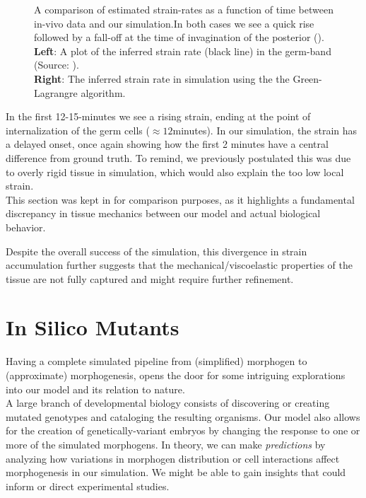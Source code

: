 \begin{figure}[H]
\begin{subfigure}{0.45\linewidth}
    \end{subfigure}
    \caption{A comparison of estimated strain-rates as a function of time between in-vivo data and our simulation.In both cases we see a quick rise followed by a fall-off at the time of invagination of the posterior (). \\\textbf{Left}: A plot of the inferred strain rate (black line) in the germ-band (Source: ). \\\textbf{Right}: The inferred strain rate in simulation using the the Green-Lagrangre algorithm.\\
   }
    \label{fig:strain}
\end{figure}

In the first 12-15-minutes we see a rising strain, ending at the point of internalization of the germ cells ($\approx12$minutes). In our simulation, the strain has a delayed onset, once again showing how the first 2 minutes have a central difference from ground truth. To remind, we previously postulated this was due to overly rigid tissue in simulation, which would also explain the too low local strain. \\

This section was kept in for comparison purposes, as it highlights a fundamental discrepancy in tissue mechanics between our model and actual biological behavior.  

Despite the overall success of the simulation, this divergence in strain accumulation further suggests that the mechanical/viscoelastic properties of the tissue are not fully captured and might require further refinement. 



\newpage
\section{In Silico Mutants}
Having a complete simulated pipeline from (simplified) morphogen to (approximate) morphogenesis, opens the door for some intriguing explorations into our model and its relation to nature. \\


A large branch of developmental biology consists of discovering or creating mutated genotypes and cataloging the resulting organisms. 
Our model also allows for the creation of genetically-variant embryos by changing the response to one or more of the simulated morphogens. In theory, we can make \textit{predictions} by analyzing how variations in morphogen distribution or cell interactions affect morphogenesis in our simulation. We might be able to gain insights that could inform or direct experimental studies.\\

